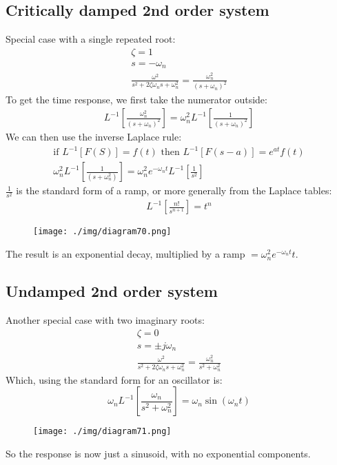 \subsection{Critically damped 2nd order system}
Special case with a single repeated root:
\begin{gather}
  \zeta = 1\\
  s = -\omega_n\\
  \frac{\omega^2}{s^2 + 2\zeta\omega_n s+ \omega_n^2} = \frac{\omega_n^2}{(s+\omega_n)^2}
\end{gather}
To get the time response, we first take the numerator outside:
\begin{gather}
  L^{-1}\left[ \frac{\omega_n^2}{(s+\omega_n)^2} \right] = \omega_n^2 L^{-1} \left[ \frac{1}{(s+\omega_n)^2} \right]
\end{gather}
We can then use the inverse Laplace rule:
\begin{gather}
  \textrm{if } L^{-1} \left[F(S)\right] = f(t) \textrm{ then } L^{-1} \left[F(s-a)\right] = e^{at} f(t)\\[10pt]
  \omega_n^2 L^{-1} \left[\frac{1}{(s+\omega_n^2)}\right] = \omega_n^2 e^{-\omega_n t} L^{-1} \left[\frac{1}{s^2}\right]
\end{gather}
$\frac{1}{s^2}$ is the standard form of a ramp, or more generally from the Laplace tables:
\begin{align}
  L^{-1}\left[\frac{n!}{s^{n+1}}\right] = t^n
\end{align}
\begin{figure}[H]
  \centering
  \texttt{[image: ./img/diagram70.png]}
\end{figure}
The result is an exponential decay, multiplied by a ramp $= \omega_n^2 e^{-\omega_n t} t$.
\subsection{Undamped 2nd order system}
Another special case with two imaginary roots:
\begin{gather}
  \zeta = 0\\
  s = \pm j \omega_n\\
  \frac{\omega^2}{s^2 + 2\zeta\omega_n s+ \omega_n^2} = \frac{\omega_n^2}{s^2 + \omega_n^2}
\end{gather}
Which, using the standard form for an oscillator is:
\begin{equation}
  \omega_n L^{-1} \left[ \frac{\omega_n}{s^2 + \omega_n^2} \right] = \omega_n \sin{(\omega_n t)}
\end{equation}
\begin{figure}[H]
  \centering
  \texttt{[image: ./img/diagram71.png]}
\end{figure}
So the response is now just a sinusoid, with no exponential components.
